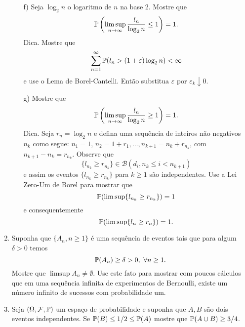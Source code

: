 \begin{enumerate}[leftmargin=*]
\begin{itemize}
	\item[f)]
	Seja $\log_2 n$ o logaritmo de $n$ na base 2. 
	Mostre que 
		\[
			\P\left(
				\limsup_{n\to\infty} \frac{l_n}{\log_2 n}\leq 1
			\right)
			=1.
		\]
	Dica. Mostre que 
		\[
			\sum_{n=1}^{\infty}
			\P(l_n>(1+\varepsilon)\log_2 n)<\infty
		\]
	e use o Lema de Borel-Cantelli. Então substitua $\varepsilon$ 
	por $\varepsilon_k\downarrow 0$.
	
	\item[g)] 
	Mostre que 
		\[
			\P\left(
				\limsup_{n\to\infty} \frac{l_n}{\log_2 n}\geq 1
			\right)
			=1.
		\]
	Dica. Seja $r_n =\log_2 n$ e defina uma sequência 
	de inteiros não negativos $n_k$ como segue:
	$n_1=1$, $n_2=1+r_1,\ldots, n_{k+1}=n_k+r_{n_k}$, com 
	$n_{k+1}-n_{k}=r_{n_k}$.
	Observe que 
		\[
			\{l_{n_k}\geq r_{n_k}\}\in 
			\mathscr{B}(d_i, n_k\leq i <n_{k+1})
		\]
	e assim os eventos $\{l_{n_k}\geq r_{n_k}\}$ para
	$k\geq 1$ são independentes. Use a Lei Zero-Um de Borel
	para mostrar que 
		\[
			\P(\limsup \{ l_{n_k} \geq r_{n_k} \}) = 1
		\]
	e consequentemente 
		\[
			\P(\limsup \{ l_{n} \geq r_{n} \}) = 1.
		\]
		
	\end{itemize}






























\item Suponha que $\{A_n, n\geq 1\}$ é uma sequência de eventos 
tais que para algum $\delta>0$ temos 
	\[
		\P(A_n)\geq \delta >0, \ \forall n\geq 1.
	\]
Mostre que $\limsup A_n \neq \emptyset$.
Use este fato para mostrar com poucos cálculos que em 
uma sequência infinita de experimentos de Bernoulli, 
existe um número infinito de sucessos com probabilidade
um.






\item 
Seja $(\Omega,\F,\P)$ um espaço de probabilidade e 
suponha que $A,B$ são dois eventos independentes.
Se $\P(B)\leq 1/2\leq \P(A)$ mostre que 
$\P(A\cup B)\geq 3/4$.







\end{enumerate}
